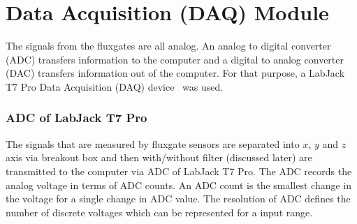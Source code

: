 \section{Data Acquisition (DAQ) Module}\label{sec:DAQ}

The signals from the fluxgates are all analog. An analog to digital converter (ADC) transfers information to the computer and a digital to analog converter (DAC) transfers information out of the computer. For that purpose, a LabJack T7 Pro Data Acquisition (DAQ) device~\cite{T7} was used.

\subsubsection{ADC of LabJack T7 Pro}

The signals that are measured by fluxgate sensors are separated into $x$, $y$ and $z$ axis via breakout box and then with/without filter (discussed later) are transmitted to the computer via ADC of LabJack T7 Pro. The ADC records the analog voltage in terms of ADC counts. An ADC count is the smallest change in the voltage for a single change in ADC value. The resolution of ADC defines the number of discrete voltages which can be represented for a input range. 



